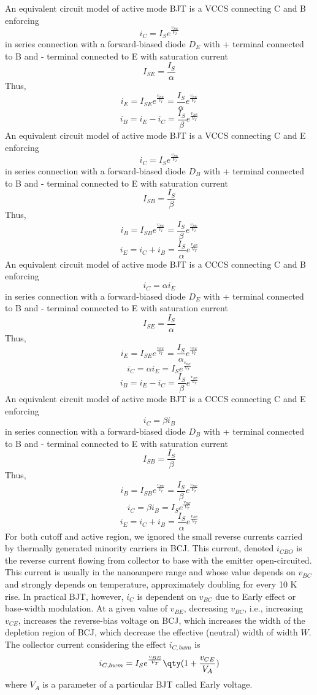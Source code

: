 \documentclass[a4paper,12pt]{report}
\begin{document}
An equivalent circuit model of active mode BJT is a VCCS connecting C and B enforcing
\[i_C=I_Se^{\frac{v_{BE}}{V_T}}\]
in series connection with a forward-biased diode $D_E$ with + terminal connected to B and - terminal connected to E with saturation current
\[I_{SE}=\frac{I_S}{\alpha}\]
Thus,
\[i_E=I_{SE}e^{\frac{v_{BE}}{V_T}}=\frac{I_S}{\alpha}e^{\frac{v_{BE}}{V_T}}\]
\[i_B=i_E-i_C=\frac{I_S}{\beta}e^{\frac{v_{BE}}{V_T}}\]
An equivalent circuit model of active mode BJT is a VCCS connecting C and E enforcing
\[i_C=I_Se^{\frac{v_{BE}}{V_T}}\]
in series connection with a forward-biased diode $D_B$ with + terminal connected to B and - terminal connected to E with saturation current
\[I_{SB}=\frac{I_S}{\beta}\]
Thus,
\[i_B=I_{SB}e^{\frac{v_{BE}}{V_T}}=\frac{I_S}{\beta}e^{\frac{v_{BE}}{V_T}}\]
\[i_E=i_C+i_B=\frac{I_S}{\alpha}e^{\frac{v_{BE}}{V_T}}\]
An equivalent circuit model of active mode BJT is a CCCS connecting C and B enforcing
\[i_C=\alpha i_E\]
in series connection with a forward-biased diode $D_E$ with + terminal connected to B and - terminal connected to E with saturation current
\[I_{SE}=\frac{I_S}{\alpha}\]
Thus,
\[i_E=I_{SE}e^{\frac{v_{BE}}{V_T}}=\frac{I_S}{\alpha}e^{\frac{v_{BE}}{V_T}}\]
\[i_C=\alpha i_E=I_Se^{\frac{v_{BE}}{V_T}}\]
\[i_B=i_E-i_C=\frac{I_S}{\beta}e^{\frac{v_{BE}}{V_T}}\]
An equivalent circuit model of active mode BJT is a CCCS connecting C and E enforcing
\[i_C=\beta i_B\]
in series connection with a forward-biased diode $D_B$ with + terminal connected to B and - terminal connected to E with saturation current
\[I_{SB}=\frac{I_S}{\beta}\]
Thus,
\[i_B=I_{SB}e^{\frac{v_{BE}}{V_T}}=\frac{I_S}{\beta}e^{\frac{v_{BE}}{V_T}}\]
\[i_C=\beta i_B=I_Se^{\frac{v_{BE}}{V_T}}\]
\[i_E=i_C+i_B=\frac{I_S}{\alpha}e^{\frac{v_{BE}}{V_T}}\]
For both cutoff and active region, we ignored the small reverse currents carried by thermally generated minority carriers in BCJ. This current, denoted $i_{CBO}$ is the reverse current flowing from collector to base with the emitter open-circuited. This current is usually in the nanoampere range and whose value depends on $v_{BC}$ and strongly depends on temperature, approximately doubling for every 10 K rise.
In practical BJT, however, $i_C$ is dependent on $v_{BC}$ due to Early effect or base-width modulation. At a given value of $v_{BE}$, decreasing $v_{BC}$, i.e., increasing $v_{CE}$, increases the reverse-bias voltage on BCJ, which increases the width of the depletion region of BCJ, which decrease the effective (neutral) width of width $W$. The collector current considering the effect $i_{C,bwm}$ is
\[i_{C,bwm}=I_Se^{\frac{v_{BE}}{V_T}}\qty(1+\frac{v_{CE}}{V_A})\]
where $V_A$ is a parameter of a particular BJT called Early voltage.
\end{document}
